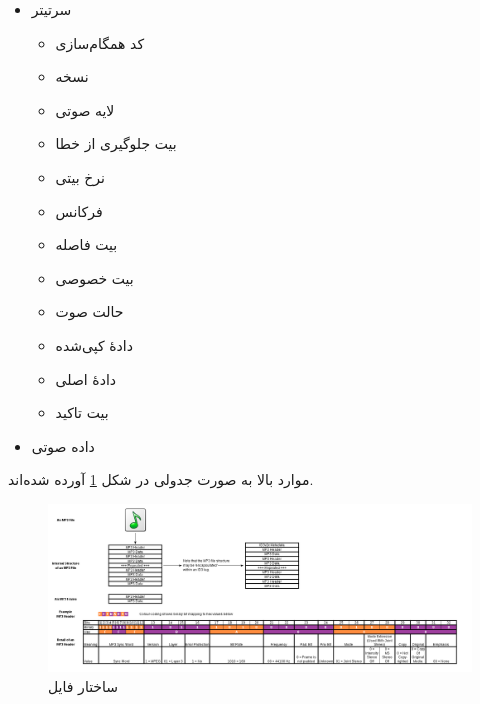  
 \begin{itemize}
        \item سرتیتر
        \begin{multicols}{2}
                \begin{itemize}
                        \item کد همگام‌سازی
                        \item نسخه
                        \item لایه صوتی
                        \item بیت جلوگیری از خطا
                        \item نرخ بیتی
                        \item فرکانس
                        \item بیت فاصله
                        \item بیت خصوصی
                        \item حالت صوت
                        \item دادهٔ کپی‌شده
                        \item دادهٔ اصلی
                        \item بیت تاکید
                \end{itemize}
        \end{multicols}
                \item داده صوتی
 \end{itemize}

 موارد بالا به صورت جدولی در شکل 
 \ref{mp3_structure}
 آورده شده‌اند.

 \begin{figure}[]
         \centering
         \includegraphics[width=\textwidth]{figs/mp3_file_structure.png}
         \caption{ساختار فایل }
         \label{mp3_structure}
 \end{figure}

